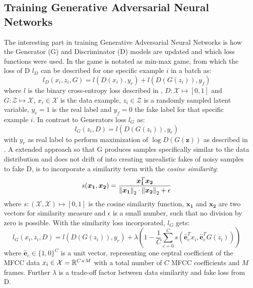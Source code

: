 \subsection{Training Generative Adversarial Neural Networks}
The interesting part in training Generative Adversarial Neural Networks is how the Generator (G) and Discriminator (D) models are updated and which loss functions were used.
In  the game is notated as min-max game, from which the loss of D $l_D$ can be described for one specific example $i$ in a batch as:
\begin{equation}
  l_D(x_i, z_i, G) = l(D(x_i), y_r) + l(D(G(z_i)), y_f)
\end{equation}
where $l$ is the binary cross-entropy loss described in , $D: \mathcal{X} \mapsto [0, 1]$ and $G: \mathcal{Z} \mapsto \mathcal{X}$, $x_i \in \mathcal{X}$ is the data example, $z_i \in \mathcal{Z}$ is a randomly sampled latent variable, $y_r = 1$ is the real label and $y_f = 0$ the fake label for that specific example $i$.
In contrast to Generators loss $l_G$ as:
\begin{equation}
  l_G(z_i, D) =  l(D(G(z_i)), y_r)
\end{equation}
with $y_r$ as real label to perform maximization of $\log D(G(\bm{z}))$ as described in .
A extended approach so that G produces samples specifically similar to the data distribution and does not drift of into creating unrealistic fakes of noisy samples to fake D, is to incorporate a similarity term with the \emph{cosine similarity}:
\begin{equation}
  s(\bm{x_1}, \bm{x_2}) = \frac{\bm{x_1}^T \bm{x_2}}{\norm{\bm{x_1}}_2 \cdot \norm{\bm{x_2}}_2 + \epsilon} 
\end{equation}
where $s : (\mathcal{X}, \mathcal{X}) \mapsto [0, 1]$ is the cosine similarity function, $\bm{x_1}$ and $\bm{x_2}$ are two vectors for similarity measure and $\epsilon$ is a small number, such that no division by zero is possible.
With the similarity loss incorporated, $l_G$ gets:
\begin{equation}
  l_G(x_i, z_i, D) =  l(D(G(z_i)), y_r) + \lambda \left(1 - \frac{1}{C} \sum_{c=0}^{C} s(\hat{\bm{e}}_c^T x_i , \hat{\bm{e}}_c^T G(z_i)) \right)
\end{equation}
where $\hat{\bm{e}}_c \in \{1, 0\}^C$ is a unit vector, representing one ceptral coefficient of the MFCC data $x_i \in \mathcal{X} = \mathbb{R}^{C \times M}$
with a total number of $C$ MFCC coefficients and $M$ frames.
Further $\lambda$ is a trade-off factor between data similarity and fake loss from D.

